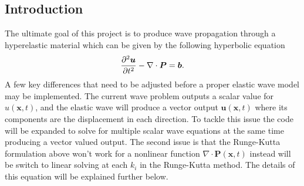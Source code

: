 \subsection{Introduction}
The ultimate goal of this project is to produce wave propagation through a hyperelastic material which can be given by the following hyperbolic equation
\begin{equation}
  \label{eq::Elastic_wave}
  \frac{\partial^2 \bm{u}}{\partial t^2} - \nabla\cdot \bm{P} = \bm{b}.
\end{equation}
A few key differences that need to be adjusted before a proper elastic wave model may be implemented. The current wave problem outputs a scalar value for $u(\bm{x},t)$, and the elastic wave will produce a vector output $\bm{u}(\bm{x},t)$ where its components are the displacement in each direction. To tackle this issue the code will be expanded to solve for multiple scalar wave equations at the same time producing a vector valued output. The second issue is that the Runge-Kutta formulation above won't work for a nonlinear function $\nabla\cdot\bm{P}(\bm{x},t)$ instead will be switch to linear solving at each $k_i$ in the Runge-Kutta method. The details of this equation will be explained further below.
